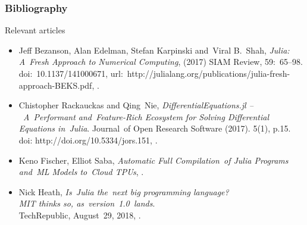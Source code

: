 \documentclass{beamer}  %
\begin{document}
\begin{frame}
  \frametitle{Bibliography}

  \begin{block}{Relevant articles}
    \begin{itemize}
    \item Jeff Bezanson, Alan Edelman, Stefan Karpinski and~Viral
      B.~Shah, \emph{Julia: A~Fresh Approach to Numerical Computing},
      (2017) SIAM Review, 59:~65--98. doi:~10.1137/141000671,
      url:~http://julialang.org/publications/julia-fresh-approach-BEKS.pdf,
      .
    \item Chistopher Rackauckas and Qing~Nie,
      \emph{DifferentialEquations.jl --~A~Performant and~Feature-Rich
        Ecosystem for Solving Differential Equations in~Julia}.
      Journal~of Open Research Software (2017). 5(1), p.15. doi:
      http://doi.org/10.5334/jors.151,
      .
    \item Keno Fischer, Elliot Saba, \emph{Automatic Full
        Compilation~of Julia Programs and~ML Models to~Cloud TPUs},
      .
    \item Nick Heath, \emph{Is~Julia the~next big programming
        language? \\
        MIT thinks so, as~version~1.0~lands}. \\
      TechRepublic, August~29, 2018,
      .
    \end{itemize}
  \end{block}
  
\end{frame}
\end{document}
